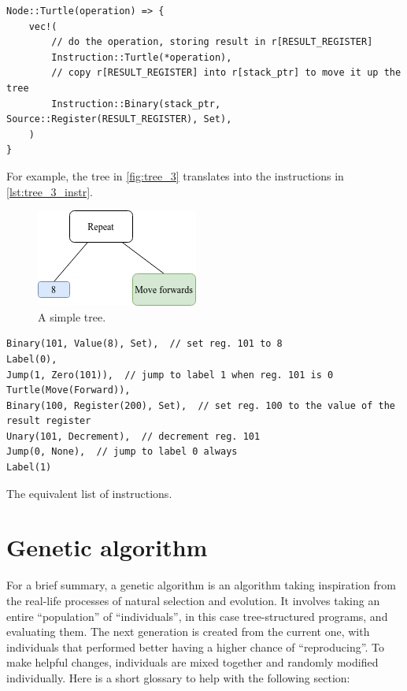 \documentclass{report}
\begin{document}
\begin{verbatim}
Node::Turtle(operation) => {
    vec!(
        // do the operation, storing result in r[RESULT_REGISTER]
        Instruction::Turtle(*operation),
        // copy r[RESULT_REGISTER] into r[stack_ptr] to move it up the tree
        Instruction::Binary(stack_ptr, Source::Register(RESULT_REGISTER), Set),
    )
}
\end{verbatim}

For example, the tree in \autoref{fig:tree_3} translates into the instructions in \autoref{lst:tree_3_instr}.

\begin{figure}[ht]
    \centering
    \includegraphics{tree_3}
    \caption{A simple tree.}
    \label{fig:tree_3}
\end{figure}

\begin{listing}[ht]
    \begin{verbatim}
Binary(101, Value(8), Set),  // set reg. 101 to 8
Label(0),
Jump(1, Zero(101)),  // jump to label 1 when reg. 101 is 0
Turtle(Move(Forward)),
Binary(100, Register(200), Set),  // set reg. 100 to the value of the result register
Unary(101, Decrement),  // decrement reg. 101
Jump(0, None),  // jump to label 0 always
Label(1)
    \end{verbatim}
    \caption{The equivalent list of instructions.}
    \label{lst:tree_3_instr}
\end{listing}

\section{Genetic algorithm}

For a brief summary, a genetic algorithm is an algorithm taking inspiration from the real-life processes of natural selection and evolution. It involves taking an entire ``population'' of ``individuals'', in this case tree-structured programs, and evaluating them. The next generation is created from the current one, with individuals that performed better having a higher chance of ``reproducing''. To make helpful changes, individuals are mixed together and randomly modified individually. Here is a short glossary to help with the following section:
\end{document}
